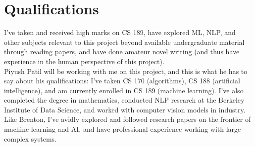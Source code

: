 \documentclass[letter]{article}
\newcommand\tab[1][1cm]{\hspace*{#1}}
\begin{document}
\section{Qualifications}
\tab I've taken and received high marks on CS 189, have explored ML, NLP, and other subjects relevant to this project beyond available undergraduate material through reading papers, and have done amateur novel writing (and thus have experience in the human perspective of this project).\\
\tab Piyush Patil will be working with me on this project, and this is what he has to say about his qualifications: I've taken CS 170 (algorithms), CS 188 (artificial intelligence), and am currently enrolled in CS 189 (machine learning). I've also completed the degree in mathematics, conducted NLP research at the Berkeley Institute of Data Science, and worked with computer vision models in industry. Like Brenton, I've avidly explored and followed research papers on the frontier of machine learning and AI, and have professional experience working with large complex systems.
\end{document}
